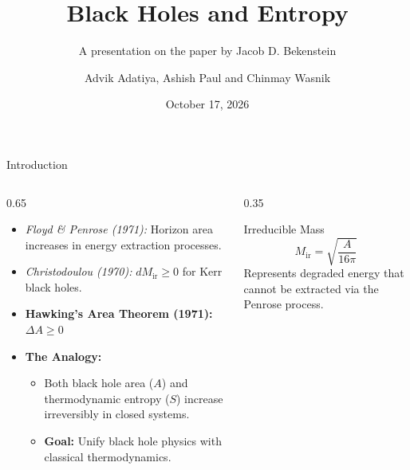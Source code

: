 \documentclass[aspectratio=169]{beamer}
\title{Black Holes and Entropy}
\subtitle{A presentation on the paper by Jacob D. Bekenstein}
\author{Advik Adatiya, Ashish Paul and Chinmay Wasnik}
\date{October 17, 2026}
\begin{document}
\begin{frame}
    \titlepage
\end{frame}

\begin{frame}{Introduction}
  \begin{columns}
    \begin{column}{0.65\textwidth}
          \begin{itemize}
            \item \textit{Floyd \& Penrose (1971):} Horizon area increases in energy extraction processes.
            \item \textit{Christodoulou (1970):} $dM_{\text{ir}} \ge 0$ for Kerr black holes.
        \item \textbf{Hawking's Area Theorem (1971):} $\Delta A \ge 0$
        \item \textbf{The Analogy:}
          \begin{itemize}
            \item Both black hole area ($A$) and thermodynamic entropy ($S$) increase irreversibly in closed systems.
            \item \textbf{Goal:} Unify black hole physics with classical thermodynamics.
          \end{itemize}
      \end{itemize}
    \end{column}
    
    \begin{column}{0.35\textwidth}
      \begin{block}{Irreducible Mass}
        \begin{equation*}
          M_{\text{ir}} = \sqrt{\frac{A}{16\pi}}
        \end{equation*}
        Represents degraded energy that cannot be extracted via the Penrose process.
      \end{block}
    \end{column}
  \end{columns}
\end{frame}
\end{document}

